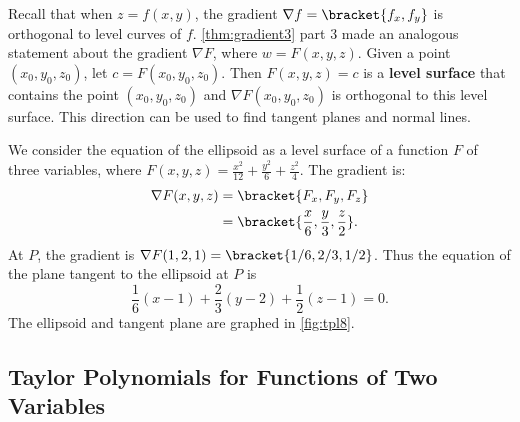 Recall that when $z=f(x,y)$, the gradient $\nabla f =\bracket{f_x,f_y}$ is orthogonal to level curves of $f$. \autoref{thm:gradient3} part 3 made an analogous statement about the gradient $\nabla F$, where $w= F(x,y,z)$. Given a point $(x_0,y_0,z_0)$, let $c = F(x_0,y_0,z_0)$. Then $F(x,y,z) = c$ is a \textbf{level surface} that contains the point $(x_0,y_0,z_0)$ and %
$\nabla F(x_0,y_0,z_0)$ is orthogonal to this level surface.
%
%
%
This direction can be used to find tangent planes and normal lines.

{We consider the equation of the ellipsoid as a level surface of a function $F$ of three variables, where $F(x,y,z) = \frac{x^2}{12} +\frac{y^2}{6}+\frac{z^2}{4}$.  The gradient is:
%
%
\begin{align*}
\nabla F(x,y,z) &=\bracket{F_x, F_y,F_z}\\
			&=\bracket{\frac x6, \frac y3, \frac z2}.
\end{align*}
At  $P$, the gradient is $\nabla F(1,2,1) =\bracket{1/6, 2/3, 1/2}$. Thus the equation of the plane tangent to the ellipsoid at $P$ is
\[\frac 16(x-1) + \frac23(y-2) + \frac 12(z-1) = 0.\]
The ellipsoid and tangent plane are graphed in \autoref{fig:tpl8}.}

\subsection*{Taylor Polynomials for Functions of Two Variables}


